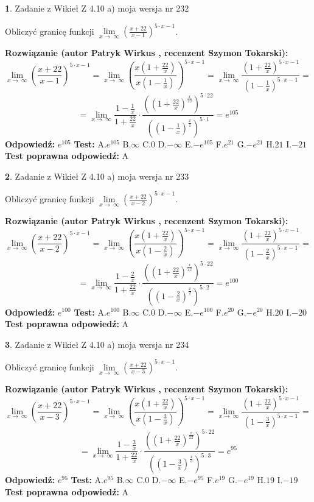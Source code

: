 \documentclass[12pt, a4paper]{article}
\theoremstyle{definition} %
\newtheorem{zad}{}
\newcommand{\zadStart}[1]{\begin{zad}#1\newline}
\newcommand{\zadStop}{\end{zad}}
\newcommand{\rozwStart}[2]{\noindent \textbf{Rozwiązanie (autor #1 , recenzent #2): }\newline}
\newcommand{\rozwStop}{\newline}
\newcommand{\odpStart}{\noindent \textbf{Odpowiedź:}\newline}
\newcommand{\odpStop}{\newline}
\newcommand{\testStart}{\noindent \textbf{Test:}\newline}
\newcommand{\testStop}{\newline}
\newcommand{\kluczStart}{\noindent \textbf{Test poprawna odpowiedź:}\newline}
\newcommand{\kluczStop}{\newline}
\begin{document}
\zadStart{Zadanie z Wikieł Z 4.10 a) moja wersja nr 232}

Obliczyć granicę funkcji  $\lim\limits_{x\to\ \infty}(\frac{x+22}{x-1})^{5\cdot x-1}$.
\zadStop
\rozwStart{Patryk Wirkus}{Szymon Tokarski}
$$\lim\limits_{x\to\ \infty}(\frac{x+22}{x-1})^{5\cdot x-1} = \lim\limits_{x\to\ \infty}(\frac{x(1+\frac{22}{x})}{x(1-\frac{1}{x})})^{5\cdot x-1}=\lim\limits_{x\to\ \infty}\frac{(1+\frac{22}{x})^{5\cdot x-1}}{(1-\frac{1}{x})^{5\cdot x-1}}=$$
$$=\lim\limits_{x\to\ \infty}\frac{1-\frac{1}{x}}{1+\frac{22}{x}}\cdot\frac{((1+\frac{22}{x})^{\frac{x}{22}})^{5\cdot22}}{((1-\frac{1}{x})^{\frac{x}{1}})^{5\cdot1}}=e^{105}$$
\rozwStop
\odpStart
$e^{105}$
\odpStop
\testStart
A.$e^{105}$ B.$\infty$ C.$0$ D.$-\infty$ E.$-e^{105}$
F.$e^{21}$ G.$-e^{21}$
H.$21$
I.$-21$
\testStop
\kluczStart
A
\kluczStop



\zadStart{Zadanie z Wikieł Z 4.10 a) moja wersja nr 233}

Obliczyć granicę funkcji  $\lim\limits_{x\to\ \infty}(\frac{x+22}{x-2})^{5\cdot x-1}$.
\zadStop
\rozwStart{Patryk Wirkus}{Szymon Tokarski}
$$\lim\limits_{x\to\ \infty}(\frac{x+22}{x-2})^{5\cdot x-1} = \lim\limits_{x\to\ \infty}(\frac{x(1+\frac{22}{x})}{x(1-\frac{2}{x})})^{5\cdot x-1}=\lim\limits_{x\to\ \infty}\frac{(1+\frac{22}{x})^{5\cdot x-1}}{(1-\frac{2}{x})^{5\cdot x-1}}=$$
$$=\lim\limits_{x\to\ \infty}\frac{1-\frac{2}{x}}{1+\frac{22}{x}}\cdot\frac{((1+\frac{22}{x})^{\frac{x}{22}})^{5\cdot22}}{((1-\frac{2}{x})^{\frac{x}{2}})^{5\cdot2}}=e^{100}$$
\rozwStop
\odpStart
$e^{100}$
\odpStop
\testStart
A.$e^{100}$ B.$\infty$ C.$0$ D.$-\infty$ E.$-e^{100}$
F.$e^{20}$ G.$-e^{20}$
H.$20$
I.$-20$
\testStop
\kluczStart
A
\kluczStop



\zadStart{Zadanie z Wikieł Z 4.10 a) moja wersja nr 234}

Obliczyć granicę funkcji  $\lim\limits_{x\to\ \infty}(\frac{x+22}{x-3})^{5\cdot x-1}$.
\zadStop
\rozwStart{Patryk Wirkus}{Szymon Tokarski}
$$\lim\limits_{x\to\ \infty}(\frac{x+22}{x-3})^{5\cdot x-1} = \lim\limits_{x\to\ \infty}(\frac{x(1+\frac{22}{x})}{x(1-\frac{3}{x})})^{5\cdot x-1}=\lim\limits_{x\to\ \infty}\frac{(1+\frac{22}{x})^{5\cdot x-1}}{(1-\frac{3}{x})^{5\cdot x-1}}=$$
$$=\lim\limits_{x\to\ \infty}\frac{1-\frac{3}{x}}{1+\frac{22}{x}}\cdot\frac{((1+\frac{22}{x})^{\frac{x}{22}})^{5\cdot22}}{((1-\frac{3}{x})^{\frac{x}{3}})^{5\cdot3}}=e^{95}$$
\rozwStop
\odpStart
$e^{95}$
\odpStop
\testStart
A.$e^{95}$ B.$\infty$ C.$0$ D.$-\infty$ E.$-e^{95}$
F.$e^{19}$ G.$-e^{19}$
H.$19$
I.$-19$
\testStop
\kluczStart
A
\kluczStop
\end{document}
